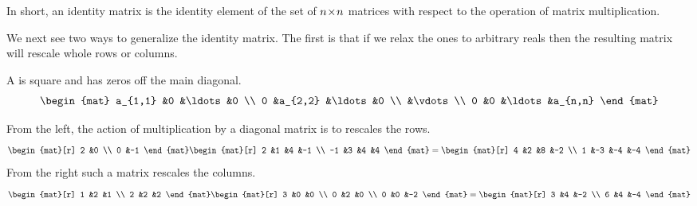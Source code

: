 \noindent In short, an identity matrix is the identity element 
of the set of $n \! \times \! n$ matrices with
respect to the operation of matrix multiplication.

We next see two ways to generalize the identity matrix.
The first is that if we relax the ones to arbitrary reals then
the resulting matrix will rescale whole rows or columns.
\begin{definition}
A 
is square and has zeros off the main diagonal.
\begin{equation*}
    \begin{mat}
       a_{1,1}  &0        &\ldots     &0     \\
       0        &a_{2,2}  &\ldots     &0     \\
                &\vdots                      \\
       0        &0        &\ldots     &a_{n,n}
    \end{mat}
\end{equation*}
\end{definition}

\begin{example}
From the left, 
the action of multiplication by a diagonal matrix is to
rescales the rows.
\begin{equation*}
    \begin{mat}[r]
       2  &0   \\
       0  &-1
    \end{mat}
    \begin{mat}[r]
       2  &1  &4  &-1  \\
      -1  &3  &4  &4
    \end{mat}
  =
    \begin{mat}[r]
       4  &2  &8  &-2  \\
       1  &-3 &-4 &-4
    \end{mat}
\end{equation*}
From the right such a matrix rescales the columns.
\begin{equation*}
     \begin{mat}[r]
        1  &2  &1  \\
        2  &2  &2
     \end{mat}
    \begin{mat}[r]
      3  &0  &0  \\
      0  &2  &0  \\
      0  &0  &-2
    \end{mat}
  =
     \begin{mat}[r]
        3  &4  &-2 \\
        6  &4  &-4
     \end{mat}
\end{equation*}
\end{example}

